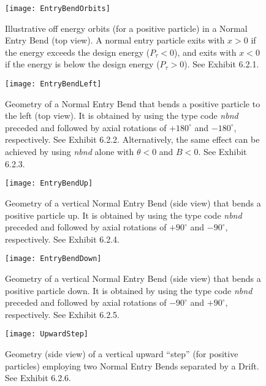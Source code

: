 \begin{figure}[hp]
  \centering
  \texttt{[image: EntryBendOrbits]}
  \caption{Illustrative off energy orbits (for a positive particle) in a
Normal Entry Bend (top view).  A normal entry particle exits with $x > 0$ if
the energy exceeds the design energy ($P_{\tau}< 0$), and exits with $x < 0$ if the
energy is below the design energy ($P_{\tau}> 0$).  See Exhibit 6.2.1.}
\end{figure}

\begin{figure}[hp]
  \centering
  \texttt{[image: EntryBendLeft]}
  \caption{Geometry of a Normal Entry Bend that bends a positive
particle to the left (top view).  It is obtained by using the type code
{\em nbnd } preceded and followed by axial rotations of $+180^\circ$ and $-180^\circ$,
respectively.  See Exhibit 6.2.2.  Alternatively, the same effect can be
achieved by using {\em nbnd } alone with $\theta < 0$ and $B < 0$.  See Exhibit 6.2.3.}
\end{figure}


\begin{figure}[hp]
  \centering
  \texttt{[image: EntryBendUp]}
  \caption{Geometry of a vertical Normal Entry Bend (side view) that
bends a positive particle up.  It is obtained by using the type code {\em nbnd }
preceded and followed by axial rotations of $+90^\circ$ and $-90^\circ$,
respectively.  See Exhibit 6.2.4.}
\end{figure}

\begin{figure}[hp]
  \centering
  \texttt{[image: EntryBendDown]}
  \caption{Geometry of a vertical Normal Entry Bend (side view) that
bends a positive particle down.  It is obtained by using the type code {\em nbnd }
preceded and followed by axial rotations of $-90^\circ$ and $+90^\circ$,
respectively.  See Exhibit 6.2.5.}
\end{figure}


\begin{figure}[hp]
  \centering
  \texttt{[image: UpwardStep]}
  \caption{Geometry (side view) of a vertical upward ``step'' (for
positive particles) employing two Normal Entry Bends separated by a Drift.
See Exhibit 6.2.6.}
\end{figure}


